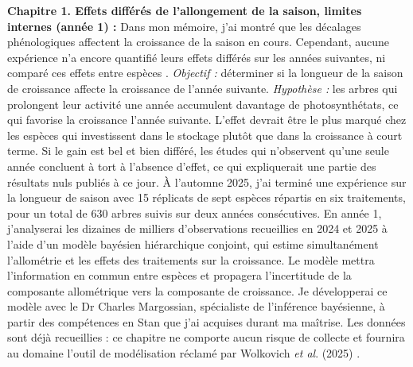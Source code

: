 \documentclass[12pt]{article}
\begin{document}
\textbf{Chapitre 1. Effets différés de l'allongement de la saison, limites internes (année 1) :}
Dans mon mémoire, j'ai montré que les décalages phénologiques affectent la croissance de la saison en cours. Cependant, aucune expérience n'a encore quantifié leurs effets différés sur les années suivantes, ni comparé ces effets entre espèces \cite{chapin_ecology_1990,landhausser_partitioning_2012,schott_premature_2013}. \textit{Objectif :} déterminer si la longueur de la saison de croissance affecte la croissance de l'année suivante. \textit{Hypothèse :} les arbres qui prolongent leur activité une année accumulent davantage de photosynthétats, ce qui favorise la croissance l'année suivante. L'effet devrait être le plus marqué chez les espèces qui investissent dans le stockage plutôt que dans la croissance à court terme. Si le gain est bel et bien différé, les études qui n'observent qu'une seule année concluent à tort à l'absence d'effet, ce qui expliquerait une partie des résultats nuls publiés à ce jour. À l'automne 2025, j'ai terminé une expérience sur la longueur de saison avec 15 réplicats de sept espèces répartis en six traitements, pour un total de 630 arbres suivis sur deux années consécutives. En année 1, j'analyserai les dizaines de milliers d'observations recueillies en 2024 et 2025 à l'aide d'un modèle bayésien hiérarchique conjoint, qui estime simultanément l'allométrie et les effets des traitements sur la croissance. Le modèle mettra l'information en commun entre espèces et propagera l'incertitude de la composante allométrique vers la composante de croissance. Je développerai ce modèle avec le Dr Charles Margossian, spécialiste de l'inférence bayésienne, à partir des compétences en Stan que j'ai acquises durant ma maîtrise. Les données sont déjà recueillies : ce chapitre ne comporte aucun risque de collecte et fournira au domaine l'outil de modélisation réclamé par Wolkovich \textit{et al}. (2025) \cite{wolkovich_2025_why}.
\end{document}
